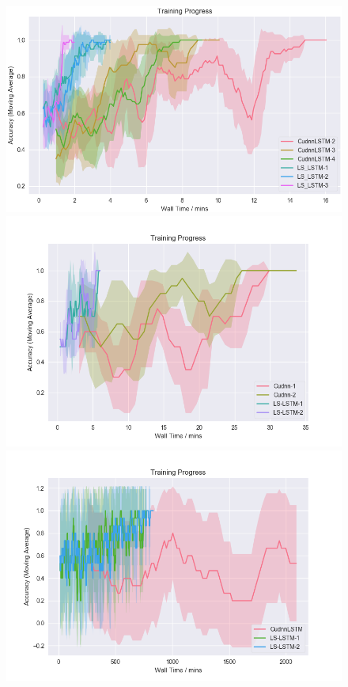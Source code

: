 \documentclass{article}
\begin{document}
\begin{figure}
  \centering
  \begin{minipage}{0.5\textwidth}
    \includegraphics[width=1.0\textwidth]{./1k_synthetic.png}
  \end{minipage}%
    \begin{minipage}{0.5\textwidth}
    \includegraphics[width=1.0\textwidth]{./8k_synthetic.png}
  \end{minipage}
  \begin{minipage}{0.6\textwidth}
    \includegraphics[width=1.0\textwidth]{./1m_synthetic.png}

\end{minipage}
\end{figure}
\end{document}
